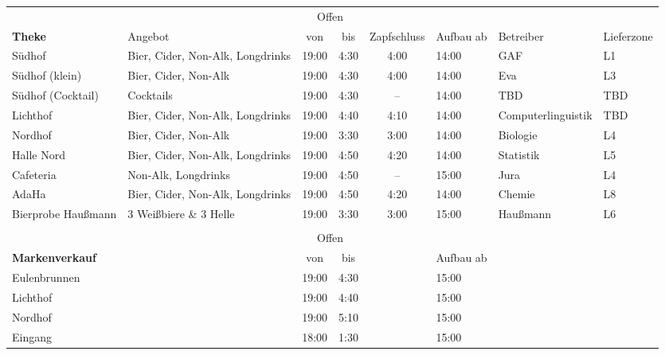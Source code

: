 \begin{tabular}{p{1.7cm}p{2.7cm}ccclp{2cm}l}
  & & \multicolumn{2}{c}{Offen} \\
  \multirow{-2}{*}{\textbf{Theke}} & \multirow{-2}{*}{Angebot} & von & bis & \multirow{-2}{*}{\parbox{1cm}{Zapf\-schluss}} & \multirow{-2}{*}{\parbox{1cm}{Aufbau ab}} & \multirow{-2}{*}{Betreiber} & \multirow{-2}{*}{Lieferzone} \\ \hline \hline
  Südhof & Bier, Cider, Non-Alk, Longdrinks & 19:00 & 4:30 & 4:00 & 14:00 & GAF & L1 \\ \hline
  Südhof (klein) & Bier, Cider, Non-Alk & 19:00 & 4:30 & 4:00 & 14:00 & Eva & L3 \\ \hline
  Südhof (Cocktail) & Cocktails & 19:00 & 4:30 & -- & 14:00 & TBD & TBD \\ \hline %
  Lichthof & Bier, Cider, Non-Alk, Longdrinks & 19:00 & 4:40 & 4:10 & 14:00 & Computer\-linguistik & TBD \\ \hline %
  Nordhof & Bier, Cider, Non-Alk & 19:00 & 3:30 & 3:00 & 14:00 & Biologie & L4 \\ \hline
  Halle Nord & Bier, Cider, Non-Alk, Longdrinks & 19:00 & 4:50 & 4:20 & 14:00 & Statistik & L5 \\ \hline
  Cafeteria & Non-Alk, Longdrinks & 19:00 & 4:50 & -- & 15:00 & Jura & L4 \\ \hline %
  AdaHa & Bier, Cider, Non-Alk, Longdrinks & 19:00 & 4:50 & 4:20 & 14:00 & Chemie & L8 \\ \hline
  Bierprobe Haußmann & 3 Weißbiere \& 3 Helle & 19:00 & 3:30 & 3:00 & 15:00 & Haußmann & L6 \\ \\
                      & & \multicolumn{2}{c}{Offen} \\
  \multirow{-2}{*}{\textbf{Markenverkauf}} & & von & bis & & \multirow{-2}{*}{\parbox{1cm}{Aufbau ab}} \\ \hline \hline
  Eulenbrunnen & & 19:00 & 4:30 & & 15:00 \\
  Lichthof & & 19:00 & 4:40 & & 15:00 \\
  Nordhof & & 19:00 & 5:10 & & 15:00 \\
  Eingang & & 18:00 & 1:30 & & 15:00
\end{tabular}

